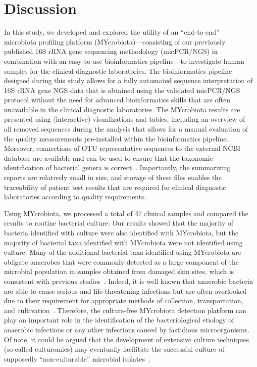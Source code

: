 \section*{Discussion}

In this study, we developed and explored the utility of an “end-to-end” microbiota profiling platform (MYcrobiota)—consisting of our
previously published 16S rRNA gene sequencing methodology (micPCR/NGS) in combination with an easy-to-use bioinformatics pipeline—to
investigate human samples for the clinical diagnostic laboratories. The bioinformatics pipeline designed during this study allows for
a fully automated sequence interpretation of 16S rRNA gene NGS data that is obtained using the validated micPCR/NGS protocol without
the need for advanced bioinformatics skills that are often unavailable in the clinical diagnostic laboratories. The MYcrobiota results
are presented using (interactive) visualizations and tables, including an overview of all removed sequences during the analysis that
allows for a manual evaluation of the quality measurements pre-installed within the bioinformatics pipeline. Moreover, connections of
OTU representative sequences to the external NCBI database are available and can be used to ensure that the taxonomic identification
of bacterial genera is correct~\cite{boers2016suddenly}. Importantly, the summarizing reports are relatively small in size, and storage of these files
enables the traceability of patient test results that are required for clinical diagnostic laboratories according to quality requirements.

Using MYcrobiota, we processed a total of 47 clinical samples and compared the results to routine bacterial culture. Our results showed
that the majority of bacteria identified with culture were also identified with MYcrobiota, but the majority of bacterial taxa identified
with MYcrobiota were not identified using culture. Many of the additional bacterial taxa identified using MYcrobiota are obligate anaerobes
that were commonly detected as a large component of the microbial population in samples obtained from damaged skin sites, which is consistent
with previous studies~\cite{price2009community,smith2016one}. Indeed, it is well known that anaerobic bacteria are able to cause serious and life-threatening infections
but are often overlooked due to their requirement for appropriate methods of collection, transportation, and cultivation~\cite{brook2002clinical}. Therefore,
the culture-free MYcrobiota detection platform can play an important role in the identification of the bacteriological etiology of anaerobic
infections or any other infections caused by fastidious microorganisms. Of note, it could be argued that the development of extensive culture
techniques (so-called culturomics) may eventually facilitate the successful culture of supposedly “non-culturable” microbial isolates~\cite{lagier2015rebirth}.

